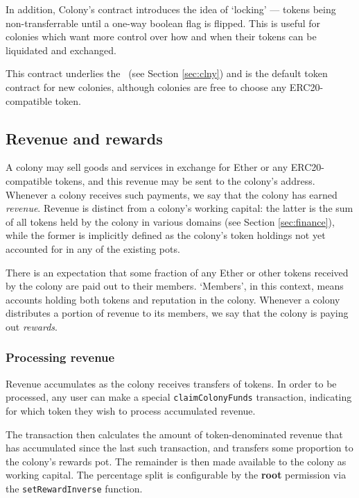 In addition, Colony's  contract introduces the idea of `locking' --- tokens being non-transferrable until a one-way boolean flag is flipped. This is useful for colonies which want more control over how and when their tokens can be liquidated and exchanged.

This contract underlies the \rct\ (see Section \ref{sec:clny}) and is the default token contract for new colonies, although colonies are free to choose any ERC20-compatible token.

\subsection{Revenue and rewards}\label{sec:revenue}

A colony may sell goods and services in exchange for Ether or any ERC20-compatible tokens, and this revenue may be sent to the colony's address. Whenever a colony receives such payments, we say that the colony has earned \emph{revenue}. Revenue is distinct from a colony's working capital: the latter is the sum of all tokens held by the colony in various domains (see Section \ref{sec:finance}), while the former is implicitly defined as the colony's token holdings not yet accounted for in any of the existing pots.

There is an expectation that some fraction of any Ether or other tokens received by the colony are paid out to their members. `Members', in this context, means accounts holding both tokens and reputation in the colony. Whenever a colony distributes a portion of revenue to its members, we say that the colony is paying out \emph{rewards}.

\subsubsection{Processing revenue}

Revenue accumulates as the colony receives transfers of tokens. In order to be processed, any user can make a special \texttt{claimColonyFunds} transaction, indicating for which token they wish to process accumulated revenue.

The transaction then calculates the amount of token-denominated revenue that has accumulated since the last such transaction, and transfers some proportion to the colony's rewards pot. The remainder is then made available to the colony as working capital. The percentage split is configurable by the \textbf{root} permission via the \texttt{setRewardInverse} function.

